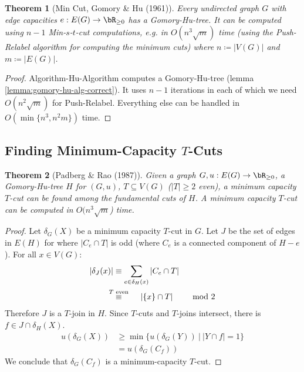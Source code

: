 \documentclass[11pt, a4paper]{article}
\newcommand{\stackalign}[2]{\stackrel{\mathclap{#1}}{#2}}
\newcommand{\abs}[1]{\left\lvert#1\right\rvert}
\newcommand{\set}[1]{\{#1\}}
\newtheorem{theorem}{Theorem}[section]
\theoremstyle{remark}
\theoremstyle{definition}
\begin{document}
\begin{theorem}[Min Cut, Gomory \& Hu (1961)]
	Every undirected graph $G$ with edge capacities $e: E(G)\to\bR_{\geq0}$
	has a Gomory-Hu-tree. It can be computed using $n-1$ Min-$s$-$t$-cut
	computations, e.g. in $O(n^3\sqrt{m})$ time (using the Push-Relabel
	algorithm for computing the minimum cuts) where $n\coloneqq \abs{V(G)}$
	and $m\coloneqq \abs{E(G)}$.
\end{theorem}
\begin{proof}
	Algorithm-Hu-Algorithm computes a Gomory-Hu-tree  (lemma \ref{lemma:gomory-hu-alg-correct}).
	It uses $n-1$ iterations in each of which we need $O(n^2\sqrt{m})$ for
	Push-Relabel. Everything else can be handled in $O(\min\set{n^3,n^2m})$ time.
\end{proof}

\subsection{Finding Minimum-Capacity \texorpdfstring{$T$}{T}-Cuts}

\begin{theorem}[Padberg \& Rao (1987)]
	Given a graph $G, u: E(G)\to\bR_{\geq0}$, a Gomory-Hu-tree $H$ for $(G,u)$,
	$T\subseteq V(G)$ ($\abs{T}\geq2$ even), a minimum capacity $T$-cut can
	be found among the fundamental cuts of $H$. A minimum capacity $T$-cut
	can be computed in $O(n^3\sqrt{m}$) time.
\end{theorem}
\begin{proof}
	Let $\delta_G(X)$ be a minimum capacity $T$-cut in $G$. Let $J$ be the set
	of edges in $E(H)$ for where $\abs{C_e\cap T}$ is odd (where $C_e$ is a
	connected component of $H-e$). For all $x\in V(G)$:
	\begin{align*}
		\abs{\delta_J(x)} & \equiv \sum_{e\in \delta_H(x)}\abs{C_e\cap T}                         \\
		                  & \stackalign{T\text{ even}}{\equiv}\qquad \abs{\set{x}\cap T} & \mod 2
	\end{align*}
	Therefore $J$ is a $T$-join in $H$. Since $T$-cuts and $T$-joins intersect,
	there is $f\in J\cap \delta_H(X)$.
	\begin{align*}
		u(\delta_G(X)) & \geq \min\set{u(\delta_G(Y))\ |\ \abs{Y\cap f}=1} \\
		               & =u(\delta_G(C_f))
	\end{align*}
	We conclude that $\delta_G(C_f)$ is a minimum-capacity $T$-cut.
\end{proof}
\end{document}
